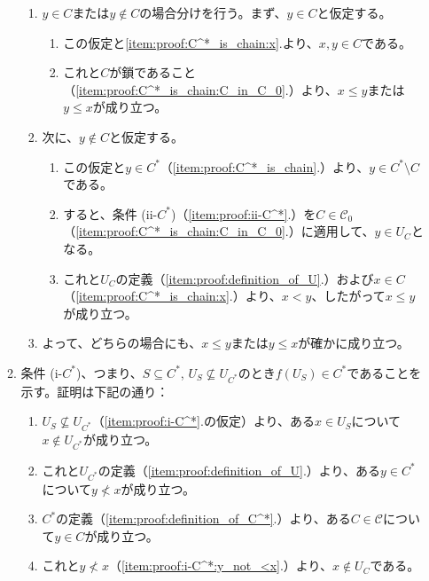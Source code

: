 ﻿\documentclass{ltjsarticle}
\theoremstyle{definition}
\begin{document}
\begin{enumerate}
\begin{enumerate}
\begin{enumerate}
            \item $y \in C$または$y \not\in C$の場合分けを行う。まず、$y \in C$と仮定する。
            \begin{enumerate}
                \item \label{item:proof:C^*_is_chain:y_in_C:x_and_y} この仮定と\ref{item:proof:C^*_is_chain:x}.より、$x,y \in C$である。
                \item これと$C$が鎖であること（\ref{item:proof:C^*_is_chain:C_in_C_0}.）より、$x \leq y$または$y \leq x$が成り立つ。
            \end{enumerate}
            \item \label{item:proof:C^*_is_chain:y_not_in_C} 次に、$y \not\in C$と仮定する。
            \begin{enumerate}
                \item この仮定と$y \in C^*$（\ref{item:proof:C^*_is_chain}.）より、$y \in C^* \setminus C$である。
                \item すると、条件 (ii-$C^*$)（\ref{item:proof:ii-C^*}.）を$C \in \mathcal{C}_0$（\ref{item:proof:C^*_is_chain:C_in_C_0}.）に適用して、$y \in U_{C}$となる。
                \item これと$U_C$の定義（\ref{item:proof:definition_of_U}.）および$x \in C$（\ref{item:proof:C^*_is_chain:x}.）より、$x < y$、したがって$x \leq y$が成り立つ。
            \end{enumerate}
            \item よって、どちらの場合にも、$x \leq y$または$y \leq x$が確かに成り立つ。
        \end{enumerate}
        \item \label{item:proof:i-C^*} 条件 (i-$C^*$)、つまり、$S \subseteq C^*$, $U_S \not\subseteq U_{C^*}$のとき$f(U_S) \in C^*$であることを示す。証明は下記の通り：
        \begin{enumerate}
            \item \label{item:proof:i-C^*:x} $U_S \not\subseteq U_{C^*}$（\ref{item:proof:i-C^*}.の仮定）より、ある$x \in U_S$について$x \not\in U_{C^*}$が成り立つ。
            \item \label{item:proof:i-C^*:y_not_<x} これと$U_{C^*}$の定義（\ref{item:proof:definition_of_U}.）より、ある$y \in C^*$について$y \not< x$が成り立つ。
            \item \label{item:proof:i-C^*:y_in_C} $C^*$の定義（\ref{item:proof:definition_of_C^*}.）より、ある$C \in \mathcal{C}$について$y \in C$が成り立つ。
            \item \label{item:proof:i-C^*:x_not_in_U_C} これと$y \not< x$（\ref{item:proof:i-C^*:y_not_<x}.）より、$x \not\in U_C$である。

\end{enumerate}
\end{enumerate}
\end{enumerate}
\end{document}
